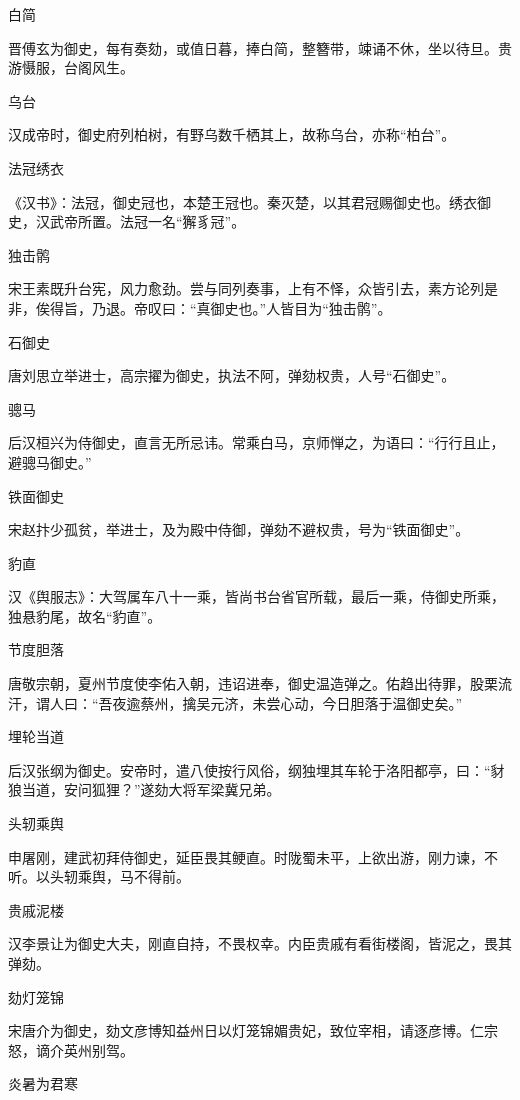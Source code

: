 \documentclass[a4paper,12pt,UTF8,twoside]{ctexbook}
\begin{document}
    白简
    
    晋傅玄为御史，每有奏劾，或值日暮，捧白简，整簪带，竦诵不休，坐以待旦。贵游慑服，台阁风生。
    
    乌台
    
    汉成帝时，御史府列柏树，有野乌数千栖其上，故称乌台，亦称“柏台”。
    
    法冠绣衣
    
    《汉书》：法冠，御史冠也，本楚王冠也。秦灭楚，以其君冠赐御史也。绣衣御史，汉武帝所置。法冠一名“獬豸冠”。
    
    独击鹘
    
    宋王素既升台宪，风力愈劲。尝与同列奏事，上有不怿，众皆引去，素方论列是非，俟得旨，乃退。帝叹曰：“真御史也。”人皆目为“独击鹘”。
    
    石御史
    
    唐刘思立举进士，高宗擢为御史，执法不阿，弹劾权贵，人号“石御史”。
    
    骢马
    
    后汉桓兴为侍御史，直言无所忌讳。常乘白马，京师惮之，为语曰：“行行且止，避骢马御史。”
    
    铁面御史
    
    宋赵抃少孤贫，举进士，及为殿中侍御，弹劾不避权贵，号为“铁面御史”。
    
    豹直
    
    汉《舆服志》：大驾属车八十一乘，皆尚书台省官所载，最后一乘，侍御史所乘，独悬豹尾，故名“豹直”。
    
    节度胆落
    
    唐敬宗朝，夏州节度使李佑入朝，违诏进奉，御史温造弹之。佑趋出待罪，股栗流汗，谓人曰：“吾夜逾蔡州，擒吴元济，未尝心动，今日胆落于温御史矣。”
    
    埋轮当道
    
    后汉张纲为御史。安帝时，遣八使按行风俗，纲独埋其车轮于洛阳都亭，曰：“豺狼当道，安问狐狸？”遂劾大将军梁冀兄弟。
    
    头轫乘舆
    
    申屠刚，建武初拜侍御史，延臣畏其鲠直。时陇蜀未平，上欲出游，刚力谏，不听。以头轫乘舆，马不得前。
    
    贵戚泥楼
    
    汉李景让为御史大夫，刚直自持，不畏权幸。内臣贵戚有看街楼阁，皆泥之，畏其弹劾。
    
    劾灯笼锦
    
    宋唐介为御史，劾文彦博知益州日以灯笼锦媚贵妃，致位宰相，请逐彦博。仁宗怒，谪介英州别驾。
    
    炎暑为君寒
    
\end{document}
